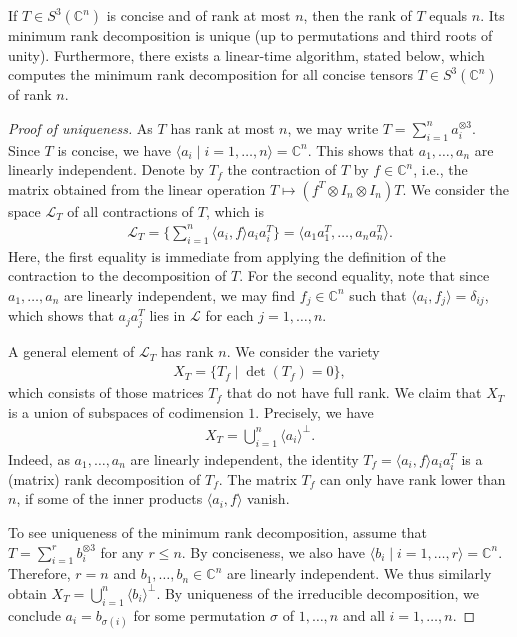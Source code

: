 \begin{theorem}\label{thm:sylvester-prony}
	If $ T \in S^3(\mathbb C^n) $ is concise and of rank at most $ n $, then the rank of $ T $ equals $ n $. Its minimum rank decomposition is unique (up to permutations and third roots of unity).
	Furthermore, there exists a linear-time algorithm, stated below, which computes the minimum rank decomposition for all concise tensors $ T\in S^3(\mathbb C^n) $ of rank $ n $. 
\end{theorem}
\begin{proof}[Proof of uniqueness]
	As $ T $ has rank at most $ n $, we may write $ T = \sum_{i = 1}^{n} a_i^{\otimes 3} $. Since $ T $ is concise, we have $ \langle a_i \mid i=1,\ldots,n \rangle = \mathbb{C}^n $. This shows that $ a_1,\ldots,a_n $ are linearly independent. Denote by $ T_f $ the contraction of $ T $ by $ f \in \mathbb{C}^n $, i.e., the matrix obtained from the linear operation $ T\mapsto (f^{T} \otimes I_n \otimes I_n) T $. We consider the space $ \mathcal{L}_T $ of all contractions of $ T $, which is
	\begin{align*}
		\mathcal{L}_T = \{\sum_{i = 1}^{n} \langle a_i, f \rangle a_ia_i^{T} \} = \langle a_1a_1^{T},\ldots,a_na_n^{T} \rangle. 
	\end{align*}
	Here, the first equality is immediate from applying the definition of the contraction to the decomposition of $ T $. For the second equality, note that since $ a_1,\ldots,a_n $ are linearly independent, we may find $ f_j\in \mathbb{C}^n $ such that $ \langle a_i, f_j \rangle = \delta_{ij} $, which shows that $ a_ja_j^{T} $ lies in $ \mathcal{L} $ for each $ j = 1,\ldots,n $. 
	
	\smallskip\noindent
	A general element of $ \mathcal{L}_T $ has rank $ n $. We consider the variety 
	\begin{align*}
		X_T = \{T_f \mid \det(T_f) = 0\}, 
	\end{align*}
	which consists of those matrices $ T_f $ that do not have full rank. We claim that $ X_T $ is a union of subspaces of codimension $ 1 $. Precisely, we have 
	\begin{align*}
		X_T = \bigcup_{i = 1}^n \langle a_i \rangle^{\perp}. 
	\end{align*} 
	Indeed, as $ a_1,\ldots,a_n $ are linearly independent, the identity $ T_f = \langle a_i, f \rangle a_ia_i^{T} $ is a (matrix) rank decomposition of $ T_f $. The matrix $ T_f $ can only have rank lower than $ n $, if some of the inner products $ \langle a_i, f \rangle $ vanish. 
	
	To see uniqueness of the minimum rank decomposition, assume that $ T = \sum_{i = 1}^{r} b_i^{\otimes 3} $ for any $ r\le n $. By conciseness, we also have $ \langle b_i \mid i=1,\ldots,r \rangle = \mathbb{C}^n $. Therefore, $ r = n $ and $ b_1,\ldots,b_n\in \mathbb{C}^n $ are linearly independent. We thus similarly obtain $ X_T = \bigcup_{i = 1}^n \langle b_i \rangle^{\perp}$. By uniqueness of the irreducible decomposition, we conclude $ a_i = b_{\sigma(i)} $ for some permutation $ \sigma $ of $ 1,\ldots,n $ and all $ i = 1,\ldots,n $.  
\end{proof}

